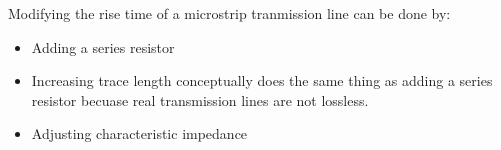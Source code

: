 \documentclass[main.tex]{subfiles}
\begin{document}
Modifying the rise time of a microstrip tranmission line can be done by:
\begin{itemize}
    \item Adding a series resistor 
    \item Increasing trace length conceptually does the same thing as adding a series resistor becuase real transmission lines are not lossless.
    \item Adjusting characteristic impedance
\end{itemize}
\end{document}
